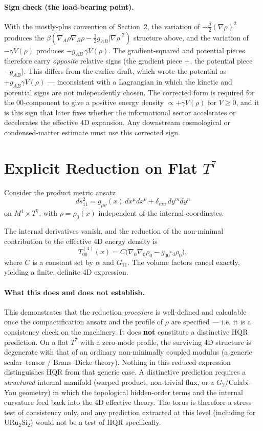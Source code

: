 \documentclass[11pt,a4paper]{article}
\begin{document}
\paragraph{Sign check (the load-bearing point).}
With the mostly-plus convention of Section~2, the variation of
\(-\tfrac{\beta}{2}(\nabla\rho)^2\) produces the
\(\beta(\nabla_A\rho\nabla_B\rho - \tfrac12 g_{AB}|\nabla\rho|^2)\) structure
above, and the variation of \(-\gamma V(\rho)\) produces
\(-g_{AB}\,\gamma V(\rho)\). The gradient-squared and potential pieces therefore
carry \emph{opposite} relative signs (the gradient piece \(+\), the potential
piece \(-g_{AB}\)). This differs from the earlier draft, which wrote the
potential as \(+g_{AB}\gamma V(\rho)\) --- inconsistent with a Lagrangian in
which the kinetic and potential signs are not independently chosen. The
corrected form is required for the \(00\)-component to give a positive energy
density \(\propto +\gamma V(\rho)\) for \(V\ge 0\), and it is this sign that
later fixes whether the informational sector accelerates or decelerates the
effective 4D expansion. Any downstream cosmological or condensed-matter estimate
must use this corrected sign.

\section{Explicit Reduction on Flat \( T^7 \)}

Consider the product metric ansatz
\[
ds_{11}^2 = g_{\mu\nu}(x)\, dx^\mu dx^\nu + \delta_{mn}\, dy^m dy^n
\]
on \( M^4 \times T^7 \), with \(\rho = \rho_0(x)\) independent of the internal
coordinates.

The internal derivatives vanish, and the reduction of the non-minimal
contribution to the effective 4D energy density is
\[
T_{00}^{(4)}(x) = C \big( \nabla_0 \nabla_0 \rho_0 - g_{00} \square_4 \rho_0 \big),
\]
where \( C \) is a constant set by \(\alpha\) and \( G_{11}\). The volume
factors cancel exactly, yielding a finite, definite 4D expression.

\paragraph{What this does and does not establish.}
This demonstrates that the reduction \emph{procedure} is well-defined and
calculable once the compactification ansatz and the profile of \(\rho\) are
specified --- i.e. it is a consistency check on the machinery. It does
\textbf{not} constitute a distinctive HQR prediction. On a flat \(T^7\) with a
zero-mode profile, the surviving 4D structure is degenerate with that of an
ordinary non-minimally coupled modulus (a generic scalar--tensor / Brans--Dicke
theory). Nothing in this reduced expression distinguishes HQR from that generic
case. A distinctive prediction requires a \emph{structured} internal manifold
(warped product, non-trivial flux, or a \(G_2\)/Calabi--Yau geometry) in which
the topological hidden-order terms and the internal curvature feed back into the
4D effective theory. The torus is therefore a stress test of consistency only,
and any prediction extracted at this level (including for URu\(_2\)Si\(_2\))
would not be a test of HQR specifically.
\end{document}
